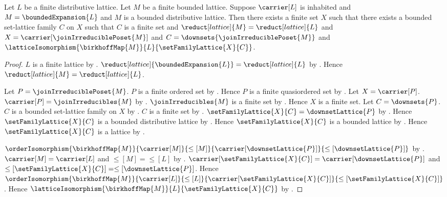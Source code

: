 \begin{theorem}
    \label{finite_distributive_lattice_isomorphic_to_set_family_lattice}
    Let $L$ be a finite distributive lattice.
    Let $M$ be a finite bounded lattice.
    Suppose $\carrier[L]$ is inhabited and
        $M=\boundedExpansion{L}$ and
        $M$ is a bounded distributive lattice.
    Then there exists a finite set $X$ such that
        there exists a bounded set-lattice family $C$ on $X$ such that
            $C$ is a finite set and
            $\reduct[lattice]{M}=\reduct[lattice]{L}$ and
            $X=\carrier[\joinIrreduciblePoset{M}]$ and
            $C=\downsets{\joinIrreduciblePoset{M}}$ and
            $\latticeIsomorphism
                {\birkhoffMap{M}}{L}{\setFamilyLattice{X}{C}}$.
\end{theorem}
\begin{proof}
    $L$ is a finite lattice by .
    $\reduct[lattice]{\boundedExpansion{L}}
        =\reduct[lattice]{L}$ by
        .
    Hence $\reduct[lattice]{M}=\reduct[lattice]{L}$.

    Let $P=\joinIrreduciblePoset{M}$.
    $P$ is a finite ordered set by
        .
    Hence $P$ is a finite quasiordered set by .
    Let $X=\carrier[P]$.
    $\carrier[P]=\joinIrreducibles{M}$ by
        .
    $\joinIrreducibles{M}$ is a finite set by
        .
    Hence $X$ is a finite set.
    Let $C=\downsets{P}$.
    $C$ is a bounded set-lattice family on $X$ by
        .
    $C$ is a finite set by .
    $\setFamilyLattice{X}{C}=\downsetLattice{P}$ by
        .
    Hence $\setFamilyLattice{X}{C}$ is a bounded distributive lattice by
        .
    Hence $\setFamilyLattice{X}{C}$ is a bounded lattice by
        .
    Hence $\setFamilyLattice{X}{C}$ is a lattice by
        .

    $\orderIsomorphism
        {\birkhoffMap{M}}
        {\carrier[M]}{\leq[M]}
        {\carrier[\downsetLattice{P}]}{\leq[\downsetLattice{P}]}$ by
        .
    $\carrier[M]=\carrier[L]$ and $\leq[M]=\leq[L]$ by
        .
    $\carrier[\setFamilyLattice{X}{C}]
        =\carrier[\downsetLattice{P}]$ and
        $\leq[\setFamilyLattice{X}{C}]
        =\leq[\downsetLattice{P}]$.
    Hence $\orderIsomorphism
        {\birkhoffMap{M}}
        {\carrier[L]}{\leq[L]}
        {\carrier[\setFamilyLattice{X}{C}]}
        {\leq[\setFamilyLattice{X}{C}]}$.
    Hence $\latticeIsomorphism
        {\birkhoffMap{M}}{L}{\setFamilyLattice{X}{C}}$ by
        .
\end{proof}
